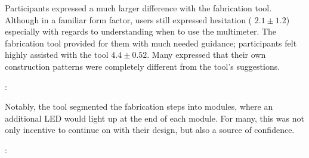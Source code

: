 \documentclass{sigchi}
\begin{document}
  Participants expressed a much larger difference with the fabrication tool. Although in a familiar form factor, users still expressed hesitation ( $2.1 \pm 1.2$) especially with regards to understanding when to use the multimeter. The fabrication tool provided for them with much needed guidance; participants felt highly assisted with the tool  $4.4 \pm 0.52$. Many expressed that their own construction patterns were completely different from the tool's suggestions.
  \begin{myquote}
   \vspace{-2pt}
    :
    \vspace{-2pt}
  \end{myquote}
  Notably, the tool segmented the fabrication steps into modules, where an additional LED would light up at the end of each module. For many, this was not only incentive to continue on with their design, but also a source of confidence.
  
  \begin{myquote}
   \vspace{-2pt}
    :
    \vspace{-2pt}
  \end{myquote}
  
\end{document}
